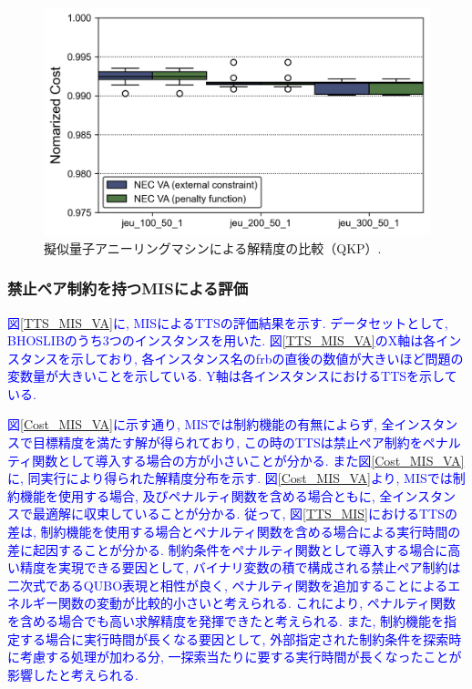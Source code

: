 \documentclass[submit,techrep,noauthor]{ipsj}
\begin{document}
\begin{figure}[t]
\centering
\includegraphics[bb=0 0 700 230, width=15cm]{Cost_QKP_VA.png}
\caption{擬似量子アニーリングマシンによる解精度の比較（QKP）.}
\label{Cost_QKP_VA}
\end{figure}

\subsubsection{禁止ペア制約を持つMISによる評価}
\textcolor{blue}{図\ref{TTS_MIS_VA}に, MISによるTTSの評価結果を示す. データセットとして, BHOSLIB\cite{mislib}のうち3つのインスタンスを用いた. 図\ref{TTS_MIS_VA}のX軸は各インスタンスを示しており, 各インスタンス名のfrbの直後の数値が大きいほど問題の変数量が大きいことを示している. Y軸は各インスタンスにおけるTTSを示している.}

\textcolor{blue}{図\ref{Cost_MIS_VA}に示す通り, MISでは制約機能の有無によらず, 全インスタンスで目標精度を満たす解が得られており, この時のTTSは禁止ペア制約をペナルティ関数として導入する場合の方が小さいことが分かる. また図\ref{Cost_MIS_VA}に, 同実行により得られた解精度分布を示す. 図\ref{Cost_MIS_VA}より, MISでは制約機能を使用する場合, 及びペナルティ関数を含める場合ともに, 全インスタンスで最適解に収束していることが分かる. 従って, 図\ref{TTS_MIS}におけるTTSの差は, 制約機能を使用する場合とペナルティ関数を含める場合による実行時間の差に起因することが分かる. 制約条件をペナルティ関数として導入する場合に高い精度を実現できる要因として, バイナリ変数の積で構成される禁止ペア制約は二次式であるQUBO表現と相性が良く, ペナルティ関数を追加することによるエネルギー関数の変動が比較的小さいと考えられる. これにより, ペナルティ関数を含める場合でも高い求解精度を発揮できたと考えられる. また, 制約機能を指定する場合に実行時間が長くなる要因として, 外部指定された制約条件を探索時に考慮する処理が加わる分, 一探索当たりに要する実行時間が長くなったことが影響したと考えられる.}
\end{document}

